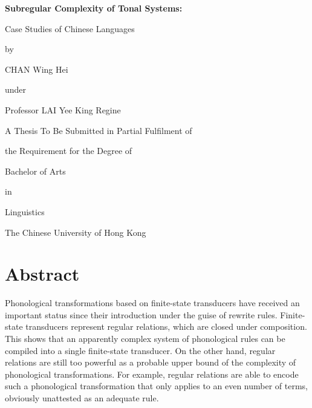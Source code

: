 \documentclass[12pt, a4paper]{report}
\newcommand{\cuhk}{The Chinese University of Hong Kong}
\begin{document}
\begin{titlepage}
  \vspace*{\fill}
  \begin{center}
    \begin{Large}
      \bfseries
      Subregular Complexity of Tonal Systems:

      Case Studies of Chinese Languages
    \end{Large}

    by

    CHAN Wing Hei

    under

    Professor LAI Yee King Regine

    \bigskip

    A Thesis To Be Submitted in Partial Fulfilment of

    the Requirement for the Degree of

    Bachelor of Arts

    in

    Linguistics

    \bigskip

    \cuhk

    \monthyyyy{}
  \end{center}
  \doclicenseThis
  \vspace*{\fill}
\end{titlepage}

\cleardoublepage
{}

\chapter*{Abstract}
Phonological transformations based on finite-state transducers have
received an important status since their introduction under the guise
of rewrite rules.  Finite-state transducers represent regular
relations, which are closed under composition.  This shows that an
apparently complex system of phonological rules can be compiled into a
single finite-state transducer.  On the other hand, regular relations
are still too powerful as a probable upper bound of the complexity of
phonological transformations.  For example, regular relations are able
to encode such a phonological transformation that only applies to an
even number of terms, obviously unattested as an adequate rule.
\end{document}
